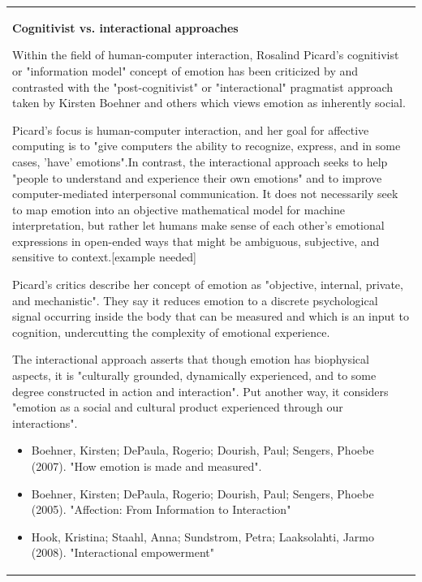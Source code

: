 \begin{center}
\begin{tabular}{|p{13cm}}
\textbf{Cognitivist vs. interactional approaches}

Within the field of human-computer interaction, Rosalind Picard's cognitivist or "information model" concept of emotion has been criticized by and contrasted with the "post-cognitivist" or "interactional" pragmatist approach taken by Kirsten Boehner and others which views emotion as inherently social.

Picard's focus is human-computer interaction, and her goal for affective computing is to "give computers the ability to recognize, express, and in some cases, 'have' emotions".In contrast, the interactional approach seeks to help "people to understand and experience their own emotions" and to improve computer-mediated interpersonal communication. It does not necessarily seek to map emotion into an objective mathematical model for machine interpretation, but rather let humans make sense of each other's emotional expressions in open-ended ways that might be ambiguous, subjective, and sensitive to context.[example needed]

Picard's critics describe her concept of emotion as "objective, internal, private, and mechanistic". They say it reduces emotion to a discrete psychological signal occurring inside the body that can be measured and which is an input to cognition, undercutting the complexity of emotional experience.

The interactional approach asserts that though emotion has biophysical aspects, it is "culturally grounded, dynamically experienced, and to some degree constructed in action and interaction". Put another way, it considers "emotion as a social and cultural product experienced through our interactions".

\begin{itemize}
\item Boehner, Kirsten; DePaula, Rogerio; Dourish, Paul; Sengers, Phoebe (2007). "How emotion is made and measured". \item Boehner, Kirsten; DePaula, Rogerio; Dourish, Paul; Sengers, Phoebe (2005). "Affection: From Information to Interaction"
\item Hook, Kristina; Staahl, Anna; Sundstrom, Petra; Laaksolahti, Jarmo (2008). "Interactional empowerment"
\end{itemize}

\end{tabular}
\end{center}

